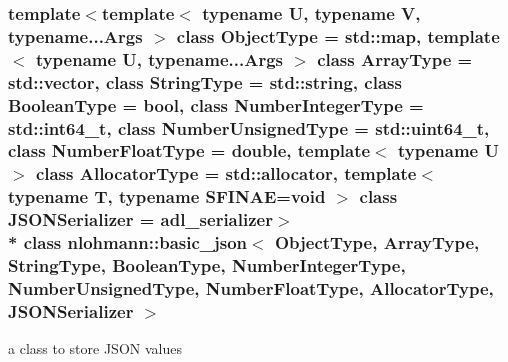 \subsubsection*{template$<$template$<$ typename U, typename V, typename...\+Args $>$ class Object\+Type = std\+::map, template$<$ typename U, typename...\+Args $>$ class Array\+Type = std\+::vector, class String\+Type = std\+::string, class Boolean\+Type = bool, class Number\+Integer\+Type = std\+::int64\+\_\+t, class Number\+Unsigned\+Type = std\+::uint64\+\_\+t, class Number\+Float\+Type = double, template$<$ typename U $>$ class Allocator\+Type = std\+::allocator, template$<$ typename T, typename S\+F\+I\+N\+A\+E=void $>$ class J\+S\+O\+N\+Serializer = adl\+\_\+serializer$>$\\*
class nlohmann\+::basic\+\_\+json$<$ Object\+Type, Array\+Type, String\+Type, Boolean\+Type, Number\+Integer\+Type, Number\+Unsigned\+Type, Number\+Float\+Type, Allocator\+Type, J\+S\+O\+N\+Serializer $>$}

a class to store J\+S\+ON values 


